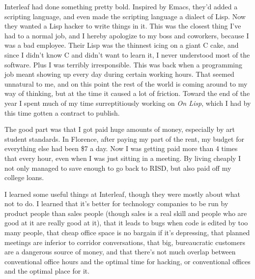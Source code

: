 Interleaf had done something pretty bold.
                  Inspired by Emacs, they'd added a scripting language, and even
                  made the scripting language a dialect of Lisp. Now they wanted
                  a Lisp hacker to write things in it. This was the closest
                  thing I've had to a normal job, and I hereby apologize to my
                  boss and coworkers, because I was a bad employee. Their Lisp
                  was the thinnest icing on a giant C cake, and since I didn't
                  know C and didn't want to learn it, I never understood most of
                  the software. Plus I was terribly irresponsible. This was back
                  when a programming job meant showing up every day during
                  certain working hours. That seemed unnatural to me, and on
                  this point the rest of the world is coming around to my way of
                  thinking, but at the time it caused a lot of friction. Toward
                  the end of the year I spent much of my time surreptitiously
                  working on \emph{On Lisp}, which I had by this time gotten a
                  contract to publish.

The good part was that I got
                  paid huge amounts of money, especially by art student
                  standards. In Florence, after paying my part of the rent, my
                  budget for everything else had been \$7 a day. Now I was
                  getting paid more than 4 times that every hour, even when I
                  was just sitting in a meeting. By living cheaply I not only
                  managed to save enough to go back to RISD, but also paid off
                  my college loans.

I learned some useful things at
                  Interleaf, though they were mostly about what not to do. I
                  learned that it's better for technology companies to be run by
                  product people than sales people (though sales is a real skill
                  and people who are good at it are really good at it), that it
                  leads to bugs when code is edited by too many people, that
                  cheap office space is no bargain if it's depressing, that
                  planned meetings are inferior to corridor conversations, that
                  big, bureaucratic customers are a dangerous source of money,
                  and that there's not much overlap between conventional office
                  hours and the optimal time for hacking, or conventional
                  offices and the optimal place for it.

